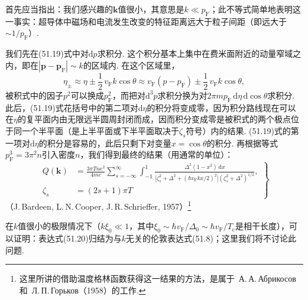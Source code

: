 首先应当指出：我们感兴趣的$\bm{k}$值很小，其意思是$k\ll p_{\mathrm{F}}$；此不等式简单地表明这一事实：超导体中磁场和电流发生改变的特征距离远大于粒子间距（即远大于$\sim1/p_{\mathrm{F}}$）.

我们先在(51.19)式中对$\mathrm{d}p$求积分. 这个积分基本上集中在费米面附近的动量窄域之内，即在$|\bm{p}-\bm{p}_{\mathrm{F}}|\sim k$的区域内. 在这个区域里，
\begin{equation*}
\eta_\pm\approx\eta\pm\frac{1}{2}\,v_{\mathrm{F}}k\cos\theta
\approx v_{\mathrm{F}}(p-p_{\mathrm{F}})\pm\frac{1}{2}\,v_{\mathrm{F}}k\cos\theta,
\end{equation*}
被积式中的因子$p^2$可以换成$p_{\mathrm{F}}^2$，而把对$\mathrm{d}^3p$求积分换为对$2\pi mp_{\mathrm{F}}\,\mathrm{d}\eta\,\mathrm{d}\cos\theta$求积分. 此后，(51.19)式花括号中的第二项对$\mathrm{d}\eta$的积分将变成零，因为积分路线现在可以在$\eta$的复平面内由无限远半圆周封闭而成，因而积分变成零是被积式的两个极点位于同一个半平面（是上半平面或下半平面取决于$\zeta_s$符号）内的结果. (51.19)式的第一项对$\mathrm{d}\eta$的积分是容易的，此后只剩下对变量$x=\cos\theta$的积分. 再根据等式$p_{\mathrm{F}}^3=3\pi^2n$引入密度$n$，我们得到最终的结果（用通常的单位）：
\begin{equation}
\left.\begin{aligned}
Q(\bm{k})&=\frac{3\pi Tne^2}{4mc}\sum_{s=-\infty}^{\infty}\int_{-1}^{1}
\frac{\Delta^2(1-x^2)\,\mathrm{d}x}
{\bigl[\zeta_s^2+\Delta^2+(\hbar v_{\mathrm{F}}kx/2)^2\bigr](\zeta_s^2+\Delta^2)^{1/2}},\\
\zeta_s&=(2s+1)\pi T
\end{aligned}\right\}
\end{equation}
（J.\,Bardeen, L.\,N.\,Cooper, J.\,R.\,Schrieffer, 1957）\footnote{这里所讲的借助温度格林函数获得这一结果的方法，是属于~А.\,А.\,Абрикосов 和~Л.\,П.\,Горьков（1958）的工作.}

在$k$值很小的极限情况下（$k\xi_0\ll1$，其中$\xi_0\sim\hbar v_{\mathrm{F}}/\Delta_0\sim\hbar v_{\mathrm{F}}/T_{\mathrm{c}}$是相干长度），可以证明：表达式(51.20)归结为与$k$无关的伦敦表达式(51.8)；这里我们将不讨论此问题.

